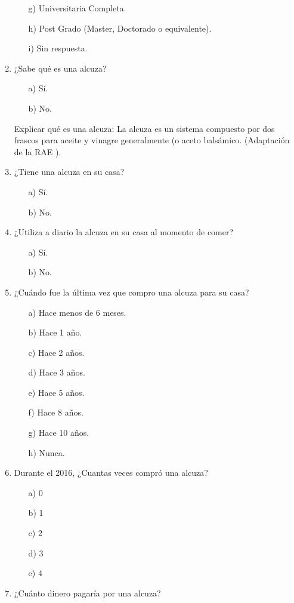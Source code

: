 \begin{enumerate}
\begin{itemize}
\item[g)] Universitaria Completa.
\item[h)] Post Grado (Master, Doctorado o equivalente).
\item[i)] Sin respuesta.
\end{itemize}
\item ¿Sabe qué es una alcuza?
\begin{itemize}
\item[a)] Sí.
\item[b)]   No.
\end{itemize}
Explicar qué es una alcuza:
La alcuza es un sistema compuesto por dos frascos para aceite y vinagre generalmente (o aceto balsámico. (Adaptación de la RAE ).
\item ¿Tiene una alcuza en su casa?
\begin{itemize}
\item[a)] Sí.
\item[b)]     No.
\end{itemize}
\item ¿Utiliza a diario la alcuza en su casa al momento de comer?
\begin{itemize}
\item[a)] Sí.
\item[b)] No.
\end{itemize}
\item ¿Cuándo fue la última vez que compro una alcuza para su casa?
\begin{itemize}
\item[a)] Hace menos de 6 meses.
\item[b)] Hace 1 año.
\item[c)] Hace 2 años.
\item[d)] Hace 3 años.
\item[e)] Hace 5 años.
\item[f)] Hace 8 años.
\item[g)] Hace 10 años.
\item[h)] Nunca.
\end{itemize}
\item Durante el 2016, ¿Cuantas veces compró una alcuza?
\begin{itemize}
\item[a)]  0
\item[b)] 1
\item[c)] 2
\item[d)] 3
\item[e)] 4
\end{itemize}
\item ¿Cuánto dinero pagaría por una alcuza?

\end{enumerate}
